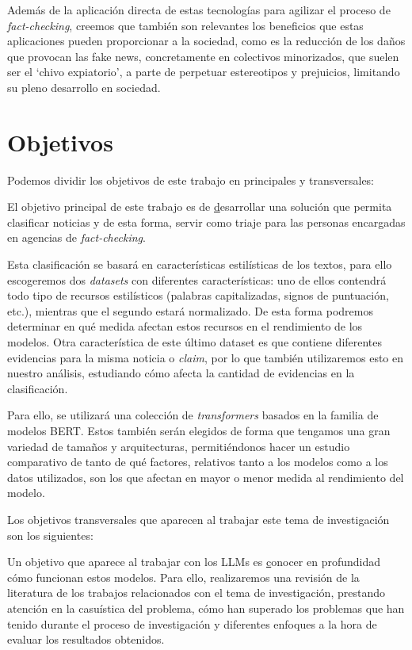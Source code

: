 Además de la aplicación directa de estas tecnologías para agilizar el proceso de \emph{fact-checking}, creemos que también son relevantes los beneficios que estas aplicaciones pueden proporcionar a la sociedad, como es la reducción de los daños que provocan las fake news, concretamente en colectivos minorizados, que suelen ser el `chivo expiatorio', a parte de perpetuar estereotipos y prejuicios, limitando su pleno desarrollo en sociedad.

\section{Objetivos}
\label{sec:objetivos}

Podemos dividir los objetivos de este trabajo en principales y transversales:

El objetivo principal de este trabajo es de {\ul desarrollar una solución que permita clasificar noticias} y de esta forma, servir como triaje para las personas encargadas en agencias de \emph{fact-checking}. 

Esta clasificación se basará en características estilísticas de los textos, para ello escogeremos dos \emph{datasets} con diferentes características: uno de ellos contendrá todo tipo de recursos estilísticos (palabras capitalizadas, signos de puntuación, etc.), mientras que el segundo estará normalizado. De esta forma podremos determinar en qué medida afectan estos recursos en el rendimiento de los modelos. Otra característica de este último dataset es que contiene diferentes evidencias para la misma noticia o \emph{claim}, por lo que también utilizaremos esto en nuestro análisis, estudiando cómo afecta la cantidad de evidencias en la clasificación.

Para ello, se utilizará una colección de \textit{transformers} basados en la familia de modelos BERT. Estos también serán elegidos de forma que tengamos una gran variedad de tamaños y arquitecturas, permitiéndonos hacer un estudio comparativo de tanto de qué factores, relativos tanto a los modelos como a los datos utilizados, son los que afectan en mayor o menor medida al rendimiento del modelo.

Los objetivos transversales que aparecen al trabajar este tema de investigación son los siguientes:

Un objetivo que aparece al trabajar con los LLMs es {\ul conocer en profundidad cómo funcionan estos modelos}. Para ello, realizaremos una revisión de la literatura de los trabajos relacionados con el tema de investigación, prestando atención en la casuística del problema, cómo han superado los problemas que han tenido durante el proceso de investigación y diferentes enfoques a la hora de evaluar los resultados obtenidos.


